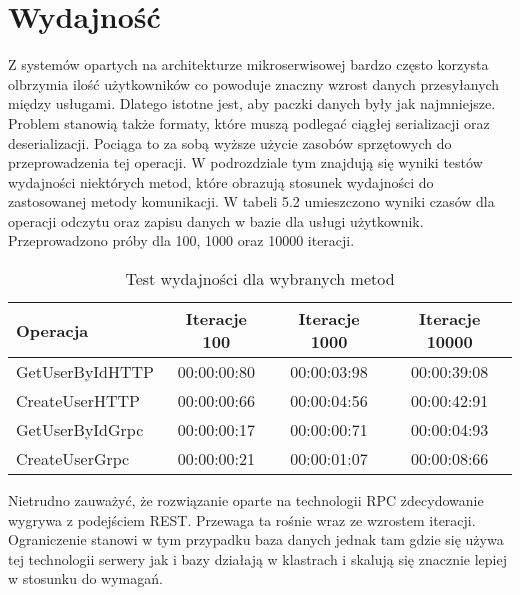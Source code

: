 \section{Wydajność}
\par Z systemów opartych na architekturze mikroserwisowej bardzo często korzysta olbrzymia ilość użytkowników co powoduje znaczny wzrost danych przesyłanych między usługami. Dlatego istotne jest, aby paczki danych były jak najmniejsze. Problem stanowią także formaty, które muszą podlegać ciągłej serializacji oraz deserializacji. Pociąga to za sobą wyższe użycie zasobów sprzętowych do przeprowadzenia tej operacji.  W podrozdziale tym znajdują się wyniki testów wydajności niektórych metod, które obrazują stosunek wydajności do zastosowanej metody komunikacji. W tabeli 5.2 umieszczono wyniki czasów dla operacji odczytu oraz zapisu danych w bazie dla usługi użytkownik. Przeprowadzono próby dla 100, 1000 oraz 10000 iteracji.
\begin{table}[h]
    \begin{center}
        \caption{Test wydajności dla wybranych metod}
        \hspace*{-1cm}
        \begin{tabular}{||M|c|c|c||}
            \toprule
            \textbf{Operacja} & \textbf{Iteracje 100} & \textbf{Iteracje 1000} & \textbf{Iteracje 10000} \\
            \midrule
            GetUserByIdHTTP   & 00:00:00:80           & 00:00:03:98            & 00:00:39:08             \\
            \midrule
            CreateUserHTTP    & 00:00:00:66           & 00:00:04:56            & 00:00:42:91             \\
            \midrule
            GetUserByIdGrpc   & 00:00:00:17           & 00:00:00:71            & 00:00:04:93             \\
            \midrule
            CreateUserGrpc    & 00:00:00:21           & 00:00:01:07            & 00:00:08:66             \\
            \midrule
            \bottomrule
        \end{tabular}
        \hspace*{-1cm}
    \end{center}
\end{table}
Nietrudno zauważyć, że rozwiązanie oparte na technologii RPC zdecydowanie wygrywa z podejściem REST. Przewaga ta rośnie wraz ze wzrostem iteracji. Ograniczenie stanowi w tym przypadku baza danych jednak tam gdzie się używa tej technologii serwery jak i bazy działają w klastrach i skalują się znacznie lepiej w stosunku do wymagań.  